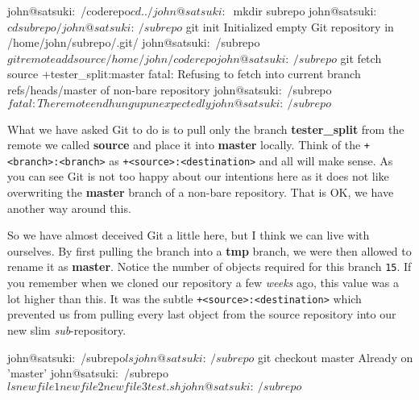 \begin{code}
john@satsuki:~/coderepo$ cd ../
john@satsuki:~$ mkdir subrepo
john@satsuki:~$ cd subrepo/
john@satsuki:~/subrepo$ git init
Initialized empty Git repository in /home/john/subrepo/.git/
john@satsuki:~/subrepo$ git remote add source /home/john/coderepo
john@satsuki:~/subrepo$ git fetch source +tester_split:master
fatal: Refusing to fetch into current branch refs/heads/master of non-bare repository
john@satsuki:~/subrepo$ fatal: The remote end hung up unexpectedly
john@satsuki:~/subrepo$
\end{code}

What we have asked Git to do is to pull only the branch \textbf{tester\_split} from the remote we called \textbf{source} and place it into \textbf{master} locally.
Think of the \texttt{+<branch>:<branch>} as \texttt{+<source>:<destination>} and all will make sense.
As you can see Git is not too happy about our intentions here as it does not like overwriting the \textbf{master} branch of a non-bare repository.
That is OK, we have another way around this.


So we have almost deceived Git a little here, but I think we can live with ourselves.
By first pulling the branch into a \textbf{tmp} branch, we were then allowed to rename it as \textbf{master}.
Notice the number of objects required for this branch \texttt{15}.
If you remember when we cloned our repository a few \emph{weeks} ago, this value was a lot higher than this.
It was the subtle \texttt{+<source>:<destination>} which prevented us from pulling every last object from the source repository into our new slim \emph{sub}-repository.

\begin{code}
john@satsuki:~/subrepo$ ls
john@satsuki:~/subrepo$ git checkout master
Already on 'master'
john@satsuki:~/subrepo$ ls
newfile1  newfile2  newfile3  test.sh
john@satsuki:~/subrepo$ 
\end{code}

